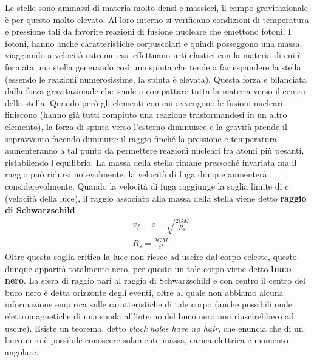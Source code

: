 \documentclass[10pt,a4paper]{article}
\begin{document}
Le stelle sono ammassi di materia molto densi e massicci, il campo gravitazionale è per questo molto elevato. Al loro interno si verificano condizioni di temperatura e pressione tali da favorire reazioni di fusione nucleare che emettono fotoni. I fotoni, hanno anche caratteristiche corpuscolari e quindi posseggono una massa, viaggiando a velocità estreme essi effettuano urti elastici con la materia di cui è formata una stella generando così una spinta che tende a far espandere la stella (essendo le reazioni numerosissime, la spinta è elevata). Questa forza è bilanciata dalla forza gravitazionale che tende a compattare tutta la materia verso il centro della stella. Quando però gli elementi con cui avvengono le fusioni nucleari finiscono (hanno già tutti compiuto una reazione trasformandosi in un altro elemento), la forza di spinta verso l'esterno diminuisce e la gravità prende il sopravvento facendo diminuire il raggio finché la pressione e temperatura aumenteranno a tal punto da permettere reazioni nucleari fra atomi più pesanti, ristabilendo l'equilibrio. La massa della stella rimane pressoché invariata ma il raggio può ridursi notevolmente, la velocità di fuga dunque aumenterà considerevolmente. Quando la velocità di fuga raggiunge la soglia limite di $c$ (velocità della luce), il raggio associato alla massa della stella viene detto \textbf{raggio di Schwarzschild}
\begin{align*}
	&v_f = c = \sqrt{\frac{2GM}{R_S}}\\
	&R_s = \frac{2GM}{c^2}
\end{align*}
Oltre questa soglia critica la luce non riesce ad uscire dal corpo celeste, questo dunque apparirà totalmente nero, per questo un tale corpo viene detto \textbf{buco nero}. La sfera di raggio pari al raggio di Schwarzschild e con centro il centro del buco nero è detta orizzonte degli eventi, oltre al quale non abbiamo alcuna informazione empirica sulle caratteristiche di tale corpo (anche possibili onde elettromagnetiche di una sonda all'interno del buco nero non riuscirebbero ad uscire). Esiste un teorema, detto \textit{black holes have no hair}, che enuncia che di un buco nero è possibile conoscere solamente massa, carica elettrica e momento angolare. 
\end{document}
